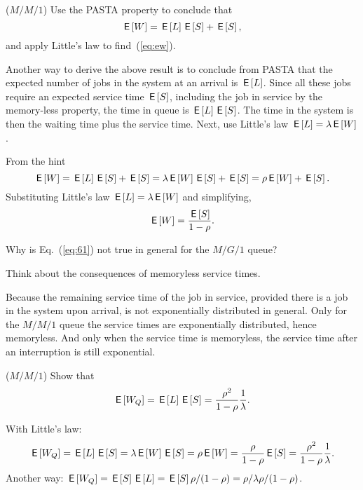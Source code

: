 \begin{exercise}($M/M/1$) Use the PASTA property to conclude that
\begin{equation}\label{eq:61}
  \,\mathsf{E}\left[W\right] = \,\mathsf{E}\left[L\right]  \,\mathsf{E}\left[S\right] + \,\mathsf{E}\left[S\right],
\end{equation}
and apply Little's law to find~(\ref{eq:ew}). 
\begin{hint}
Another way to derive the above result is to conclude from PASTA that
the expected number of jobs in the system at an arrival is $\,\mathsf{E}\left[L\right]$.
Since all these jobs require an expected service time $\,\mathsf{E}\left[S\right]$,
including the job in service by the memory-less property, the time in
queue is $\,\mathsf{E}\left[L\right] \,\mathsf{E}\left[S\right]$. The time in the system is then the waiting time
plus the service time. Next, use Little's law $\,\mathsf{E}\left[L\right] = \lambda \,\mathsf{E}\left[W\right]$.
\end{hint}
\begin{solution}
From the hint
\begin{equation}
  \,\mathsf{E}\left[W\right] = \,\mathsf{E}\left[L\right]  \,\mathsf{E}\left[S\right] + \,\mathsf{E}\left[S\right] = \lambda \,\mathsf{E}\left[W\right] \,\mathsf{E}\left[S\right] + \,\mathsf{E}\left[S\right] = \rho \,\mathsf{E}\left[W\right]  + \,\mathsf{E}\left[S\right].
\end{equation}
Substituting Little's law $\,\mathsf{E}\left[L\right] = \lambda \,\mathsf{E}\left[W\right]$ and simplifying,
\begin{equation*}
\,\mathsf{E}\left[W\right] = \frac{\,\mathsf{E}\left[S\right]}{1-\rho}.
\end{equation*}
\end{solution}
\end{exercise}


\begin{exercise}
  Why is Eq.~(\ref{eq:61}) not true in general for the $M/G/1$ queue?
  \begin{hint}
Think about the consequences of memoryless service times.
  \end{hint}
  \begin{solution}
    Because the remaining service time of the job in service, provided
    there is a job in the system upon arrival, is not exponentially
    distributed in general. Only for the $M/M/1$ queue the service
    times are exponentially distributed, hence memoryless. And only
    when the service time is memoryless, the service time after an
    interruption is still exponential.
  \end{solution}
\end{exercise}

\begin{exercise}($M/M/1$)
Show that 
\begin{equation}\label{eq:wqes}
  \,\mathsf{E}\left[W_Q\right] = \,\mathsf{E}\left[L\right] \,\mathsf{E}\left[S\right] = \frac{\rho^2}{1-\rho} \frac 1 \lambda.
\end{equation}
  \begin{solution}
With Little's law:
\begin{equation}
  \,\mathsf{E}\left[W_Q\right] = \,\mathsf{E}\left[L\right] \,\mathsf{E}\left[S\right] = \lambda \,\mathsf{E}\left[W\right] \,\mathsf{E}\left[S\right]= \rho \,\mathsf{E}\left[W\right] = \frac{\rho}{1-\rho} \,\mathsf{E}\left[S\right] = \frac{\rho^2}{1-\rho} \frac 1 \lambda.
\end{equation}
Another way: $\,\mathsf{E}\left[W_Q\right] = \,\mathsf{E}\left[S\right] \,\mathsf{E}\left[L\right] = \,\mathsf{E}\left[S\right] \rho/(1-\rho) = \rho/\lambda \rho/(1-\rho)$.
  \end{solution}
\end{exercise}

